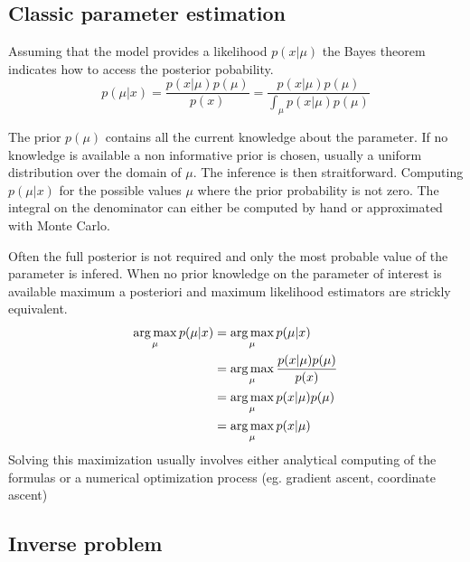 \subsection{Classic parameter estimation} %
\label{sub:classic_parameter_estimation}



Assuming that the model provides a likelihood $p(x | \mu)$ the Bayes theorem indicates how to access the posterior pobability.
\begin{equation}	
    p(\mu | x) = \frac{p(x|\mu) p(\mu)}{p(x)} = \frac{p(x|\mu) p(\mu)}{\int_\mu p(x|\mu) p(\mu)}
\end{equation}

The prior $p(\mu)$ contains all the current knowledge about the parameter. 
If no knowledge is available a non informative prior is chosen, usually a uniform distribution over the domain of $\mu$.
The inference is then straitforward.
Computing $p(\mu | x)$ for the possible values $\mu$ \ie where the prior probability is not zero.
The integral on the denominator can either be computed by hand or approximated with Monte Carlo.

Often the full posterior is not required and only the most probable value of the parameter is infered.
When no prior knowledge on the parameter of interest is available maximum a posteriori and maximum likelihood estimators are strickly equivalent.
\begin{align}
	\operatorname*{arg\,max}_\mu p(\mu | x) &= \operatorname*{arg\,max}_\mu p(\mu | x) \\
							&= \operatorname*{arg\,max}_\mu \frac{p(x|\mu) p(\mu)}{p(x)} \\
							&= \operatorname*{arg\,max}_\mu p(x|\mu) p(\mu) \\
							&= \operatorname*{arg\,max}_\mu p(x|\mu)\\
\end{align}
Solving this maximization usually involves either analytical computing of the formulas  or a numerical optimization process (eg. gradient ascent, coordinate ascent)








\subsection{Inverse problem} %
\label{sub:inverse_problem}

